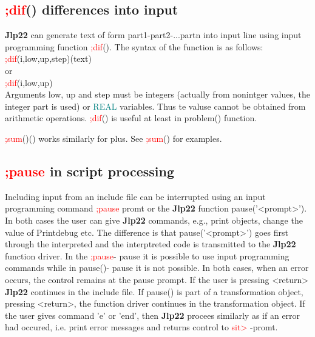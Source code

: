 \subsection{\textcolor{Red}{;dif}() differences into input} 
\label{inpudif} 
\textbf{Jlp22} can generate text of form part1-part2-...partn into input line using 
input programming function \textcolor{Red}{;dif}(). The syntax of the function is as follows:\\ 
\textcolor{Red}{;dif}(i,low,up,step)(text)\\ 
or \\ 
\textcolor{Red}{;dif}(i,low,up)\\ 
Arguments low, up and step must be integers (actually from nonintger values, the 
integer part is used) or \textcolor{teal}{REAL} variables. Thus te valuse cannot be obtained 
from arithmetic operations. \textcolor{Red}{;dif}() is useful at least in \textcolor{VioletRed}{problem}() function. 
 
\begin{note} 
\textcolor{Red}{;sum}()() works similarly for plus. See \textcolor{Red}{;sum}() for examples. 
\end{note} 
\subsection{\textcolor{Red}{;pause} in script processing} 
\label{inpupause} 
Including input from an include file can be interrupted using an input programming 
command \textcolor{Red}{;pause} promt or the \textbf{Jlp22} function \textcolor{VioletRed}{pause}('<prompt>'). In both cases 
the user can give \textbf{Jlp22} commands, e.g., print objects, change the value of Printdebug etc. 
The difference is that  \textcolor{VioletRed}{pause}('<prompt>') goes first through the interpreted and the interptreted 
code is transmitted to the \textbf{Jlp22} function driver. In the \textcolor{Red}{;pause}- pause it is possible to 
use input programming commands while in \textcolor{VioletRed}{pause}()- pause it is not possible. In both cases, when 
an error occurs, the control remains at the pause prompt. If the user is pressing 
<return> \textbf{Jlp22} continues in the include file. If \textcolor{VioletRed}{pause}() is part of a transformation object, 
pressing <return>, the function driver continues in the transformation object. 
If the user gives command 'e' or 'end', then \textbf{Jlp22} procees similarly as if an error had occured, 
i.e. print error messages and returns control to \textcolor{Red}{sit>} -promt. 
